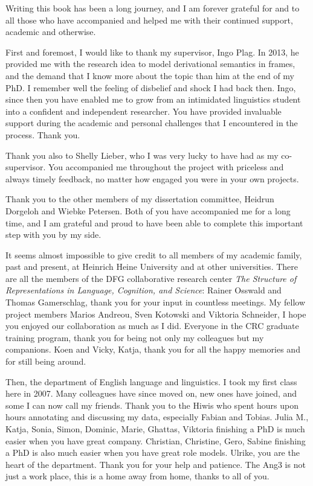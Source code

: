 \addchap{\lsAcknowledgementTitle} 

Writing this book has been a long journey, and I am forever grateful for and to all those who have accompanied and helped me with their continued support, academic and otherwise. 

First and foremost, I would like to thank my supervisor, Ingo Plag. In 2013, he provided me with the research idea to model derivational semantics in frames, and the demand that I know more about the topic than him at the end of my PhD. I remember well the feeling of disbelief and shock I had back then. 
Ingo, since then you have enabled me to grow from an intimidated linguistics student into a confident and independent researcher. You have provided invaluable support during the academic and personal challenges that I encountered in the process. Thank you. 

Thank you also to Shelly Lieber, who I was very lucky to have had as my co-supervisor. You accompanied me throughout the project with priceless and always timely feedback, no matter how engaged you were in your own projects. 

Thank you to the other members of my dissertation committee, Heidrun Dor\-ge\-loh and Wiebke Petersen. Both of you have accompanied me for a long time, and I am grateful and proud to have been able to complete this important step with you by my side. 

It seems almost impossible to give credit to all members of my academic family, past and present, at Heinrich Heine University and at other universities. 
There are all the members of the DFG collaborative research center \textit{The Structure of Representations in Language, Cognition, and Science}: 
Rainer Osswald and Thomas Gamerschlag, thank you for your input in countless meetings. 
My fellow project members Marios Andreou, Sven Kotowski and Viktoria Schneider, I hope you enjoyed our collaboration as much as I did.
Everyone in the CRC graduate training program, thank you for being not only my colleagues but my companions. 
Koen and Vicky, Katja, thank you for all the happy memories and for still being around. 

Then, the department of English language and linguistics. I took my first class here in 2007. Many colleagues have since moved on, new ones have joined, and some I can now call my friends. Thank you to the Hiwis who spent hours upon hours annotating and discussing my data, especially Fabian and Tobias. Julia M., Katja, Sonia, Simon, Dominic, Marie, Ghattas, Viktoria \textendash{} finishing a PhD is much easier when you have great company. Christian, Christine, Gero, Sabine \textendash{} finishing a PhD is also much easier when you have great role models. 
Ulrike, you are the heart of the department. Thank you for your help and patience.
The Ang3 is not just a work place, this is a home away from home, thanks to all of you.  

